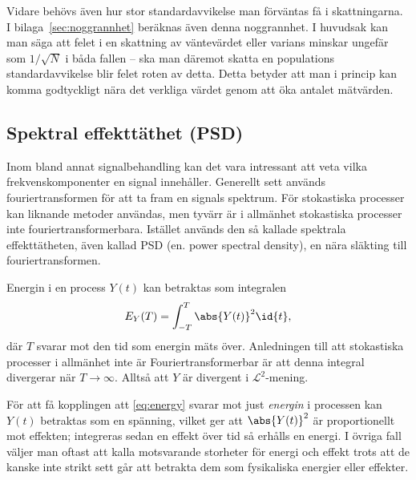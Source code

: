 Vidare behövs även hur stor standardavvikelse man förväntas få i skattningarna. I bilaga~\ref{sec:noggrannhet} beräknas även denna noggrannhet. I huvudsak kan man säga att felet i en skattning av väntevärdet eller varians\footnotemark{} minskar ungefär som $1/\sqrt{N}$ i båda fallen -- ska man däremot skatta en populations standardavvikelse blir felet roten av detta. 
Detta betyder att man i princip kan komma godtyckligt nära det verkliga värdet genom att öka antalet mätvärden.



\subsection{Spektral effekttäthet (PSD)} \label{sec:PSD}

Inom bland annat signalbehandling kan det vara intressant att veta vilka frekvenskomponenter en signal innehåller. Generellt sett används fouriertransformen för att ta fram en signals spektrum.
För stokastiska processer kan liknande metoder användas, men tyvärr är i allmänhet stokastiska processer inte fouriertransformerbara. Istället används den så kallade spektrala effekttätheten, även kallad PSD (en. power spectral density), en nära släkting till fouriertransformen.

Energin i en process $Y(t)$ kan betraktas som integralen
\begin{equation}\label{eq:energy}
E_Y(T) = \int_{-T}^{T} \abs{Y(t)}^2\id{t},
\end{equation}
där $T$ svarar mot den tid som energin mäts över. Anledningen till att stokastiska processer i allmänhet inte är Fouriertransformerbar är att denna integral divergerar när $T\to\infty$. Alltså att $Y$ är divergent i $\mathcal{L}^2$-mening. 

För att få kopplingen att \eqref{eq:energy} svarar mot just \emph{energin} i processen kan $Y(t)$ betraktas som en spänning, vilket ger att $\abs{Y(t)}^2$ är proportionellt mot effekten; integreras sedan en effekt över tid så erhålls en energi. I övriga fall väljer man oftast att kalla motsvarande storheter för energi och effekt trots att de kanske inte strikt sett går att betrakta dem som fysikaliska energier eller effekter. 

